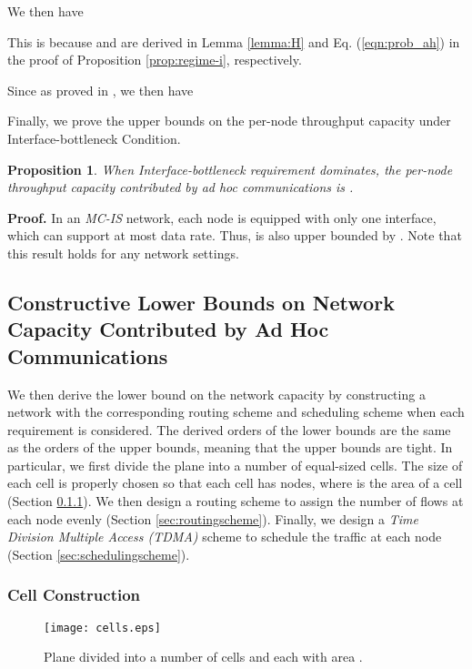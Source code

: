 \documentclass[10pt,journal]{IEEEtran}
\newtheorem{proposition}{Proposition}
\def\done{\hspace*{\fill} }
\begin{document}
We then have

This is because  and  are derived in Lemma \ref{lemma:H} and Eq. (\ref{eqn:prob_ah}) in the proof of Proposition \ref{prop:regime-i}, respectively. 

Since  as proved in \cite{Gupta:Kumar}, we then have 
\done
 
Finally, we prove the upper bounds on the per-node throughput capacity under Interface-bottleneck Condition.
\begin{proposition}
\label{prop:regime-iv}
When Interface-bottleneck requirement dominates, the per-node throughput capacity contributed by ad hoc communications is .
\end{proposition}
\textbf{Proof.}
In an \textit{MC-IS} network, each node is equipped with only one interface, which can support at most  data rate. Thus,  is also upper bounded by . Note that this result holds for any network settings. \done

\subsection{Constructive Lower Bounds on Network Capacity Contributed by Ad Hoc Communications}
\label{sec:lower-adhoc}
We then derive the lower bound on the network capacity by constructing a network with the corresponding routing scheme and scheduling scheme when each requirement is considered. The derived orders of the lower bounds are the same as the orders of the upper bounds, meaning that the upper bounds are tight. In particular, we first divide the plane into a number of equal-sized cells. The size of each cell is properly chosen so that each cell has  nodes, where  is the area of a cell (Section \ref{sec:cell}). We then design a routing scheme to assign the number of flows at each node evenly (Section \ref{sec:routingscheme}). Finally, we design a \textit{Time Division Multiple Access (TDMA)} scheme to schedule the traffic at each node (Section \ref{sec:schedulingscheme}).

\subsubsection{Cell Construction}
\label{sec:cell}

\begin{figure}[t!]
\centering
 \texttt{[image: cells.eps]}
  \caption{Plane divided into a number of cells and each with area .}
 \label{fig:cells}
\end{figure}
\end{document}
